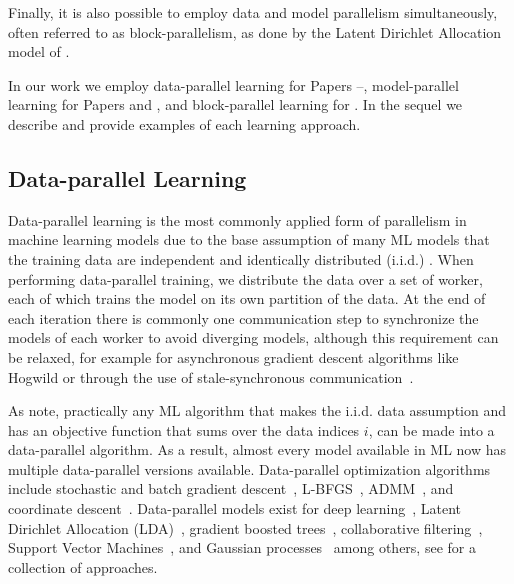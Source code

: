 Finally, it is also possible to employ data and model parallelism simultaneously,
often referred to as block-parallelism, as done by the Latent Dirichlet Allocation
model of \cite{petuum}.

In our work we employ data-parallel learning for Papers \conceptsicdmNum--\sessionlengthNum,
model-parallel learning for Papers \uncertaintreesNum and \boostvhtNum, and
block-parallel learning for \blockgbt. In the sequel we describe and provide
examples of each learning approach.

\subsection*{Data-parallel Learning}
\label{sec:bg-data-parallel}

Data-parallel learning is the most commonly applied form of parallelism
in machine learning models due to the base assumption of many ML models
that the training data are independent and identically distributed (i.i.d.)
\cite{distributed-ml-design}. When performing data-parallel training, we
distribute the data over a set of worker, each of which trains the model
on its own partition of the data. At the end of each iteration there is commonly one communication step
to synchronize the models of each worker to avoid diverging models, although
this requirement can be relaxed, for example for asynchronous gradient descent
algorithms like Hogwild \cite{hogwild} or through the use of stale-synchronous
communication~\cite{stale-sync-ps}.

As \citet{distributed-ml-design} note, practically any ML algorithm that makes
the i.i.d. data assumption and has an objective function that sums over
the data indices $i$, can be made into a data-parallel algorithm. As a result,
almost every model available in ML now has multiple data-parallel versions
available. Data-parallel optimization algorithms include stochastic and batch gradient
descent~\cite{dekel-optimal-distributed, parallel-sgd}, L-BFGS~\cite{lbfgs-large-scale, vw},
ADMM~\cite{admm, admm-async}, and coordinate descent~\cite{rendle-distributed-cd, parallel-cd}.
Data-parallel models exist for deep learning~\cite{large-scale-dl}, Latent Dirichlet Allocation (LDA)~\cite{parallel-lda},
gradient boosted trees~\cite{xgboost, lightgbm}, collaborative filtering~\cite{koren-cf, parallel-cf}, Support Vector Machines~\cite{parallel-svm, psvm, parallel-svm-survey}, and Gaussian processes~\cite{gp-big-data, gp-distributed} among others,
see \cite{parallel-ml-book} for a collection of approaches.

